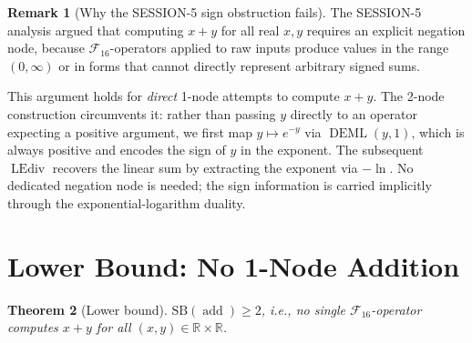 \documentclass[12pt,a4paper]{article}
\newtheorem{theorem}{Theorem}[section]
\theoremstyle{definition}
\newtheorem{remark}[theorem]{Remark}
\newcommand{\DEML}{\operatorname{DEML}}
\newcommand{\LEdiv}{\operatorname{LEdiv}}
\newcommand{\addop}{\operatorname{add}}
\newcommand{\SB}{\mathrm{SB}}
\newcommand{\F}{\mathcal{F}_{16}}
\newcommand{\R}{\mathbb{R}}
\begin{document}
\begin{remark}[Why the SESSION-5 sign obstruction fails]
\label{rem:sign}
The SESSION-5 analysis argued that computing $x + y$ for all real $x, y$
requires an explicit negation node, because $\F$-operators applied to raw
inputs produce values in the range $(0, \infty)$ or in forms that cannot
directly represent arbitrary signed sums.

This argument holds for \emph{direct} 1-node attempts to compute $x+y$.
The 2-node construction circumvents it: rather than passing $y$ directly to
an operator expecting a positive argument, we first map $y \mapsto e^{-y}$
via $\DEML(y,1)$, which is always positive and encodes the sign of $y$ in
the exponent.
The subsequent $\LEdiv$ recovers the linear sum by extracting the exponent via
$-\ln$.
No dedicated negation node is needed; the sign information is carried
implicitly through the exponential-logarithm duality.
\end{remark}

\section{Lower Bound: No 1-Node Addition}
\label{sec:lower}

\begin{theorem}[Lower bound]
\label{thm:lb}
$\SB(\addop) \ge 2$, i.e., no single $\F$-operator computes $x + y$ for all
$(x, y) \in \R \times \R$.
\end{theorem}
\end{document}
